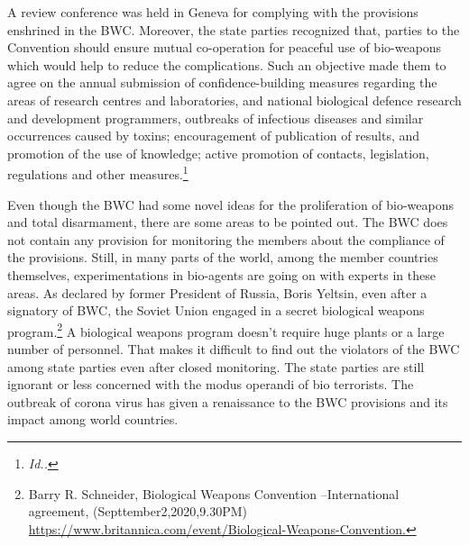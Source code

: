 \begin{multicols}{2}
\noi
A review conference was held in Geneva for complying with the provisions enshrined in the
BWC. Moreover, the state parties recognized that, parties to the Convention should ensure
mutual co-operation for peaceful use of bio-weapons which would help to reduce the
complications. Such an objective made them to agree on the annual submission of
confidence-building measures regarding the areas of research centres and laboratories, and
national biological defence research and development programmers, outbreaks of infectious
diseases and similar occurrences caused by toxins; encouragement of publication of results,
and promotion of the use of knowledge; active promotion of contacts, legislation, regulations
and other measures.\footnote{\textit{Id..}}


\noi
Even though the BWC had some novel ideas for the proliferation of bio-weapons and total
disarmament, there are some areas to be pointed out. The BWC does not contain any
provision for monitoring the members about the compliance of the provisions. Still, in many
parts of the world, among the member countries themselves, experimentations in bio-agents
are going on with experts in these areas. As declared by former President of Russia, Boris
Yeltsin, even after a signatory of BWC, the Soviet Union engaged in a secret biological 
weapons program.\footnote{Barry R. Schneider, Biological Weapons Convention –International agreement, (Septtember2,2020,9.30PM)\\ \url{https://www.britannica.com/event/Biological-Weapons-Convention.}} A biological weapons program doesn't require huge plants or a large
number of personnel. That makes it difficult to find out the violators of the BWC among state
parties even after closed monitoring. The state parties are still ignorant or less concerned with
the modus operandi of bio terrorists. The outbreak of corona virus has given a renaissance to
the BWC provisions and its impact among world countries.



\end{multicols}
